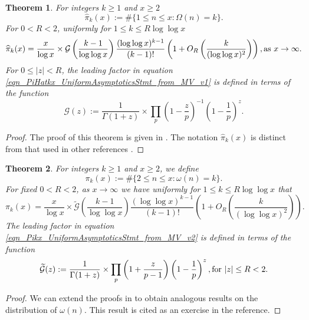 \documentclass[11pt,reqno,a4letter]{article}
\numberwithin{equation}{section}
\numberwithin{figure}{section}
\numberwithin{table}{section}
\let\citep\cite
\newcommand{\cf}{cf.~}
\theoremstyle{plain}
\newtheorem{theorem}{Theorem}
\numberwithin{theorem}{section}
\theoremstyle{definition}
\theoremstyle{remark}
\newcommand{\mathtext}[1]{\text{\rm #1}}
\begin{document}
\begin{theorem}
\label{theorem_HatPi_ExtInTermsOfGz} 
For integers $k \geq 1$ and $x \geq 2$ 
$$\widehat{\pi}_k(x) := \#\{1 \leq n \leq x: \Omega(n)=k\}.$$ 
For $0 < R < 2$, uniformly for $1 \leq k \leq R \log\log x$ 
\begin{equation}
\label{eqn_PiHatkx_UniformAsymptoticsStmt_from_MV_v1}
\widehat{\pi}_k(x) = \frac{x}{\log x} \times \mathcal{G}\left(\frac{k-1}{\log\log x}\right) 
     \frac{(\log\log x)^{k-1}}{(k-1)!} \left(1 + O_R\left(\frac{k}{(\log\log x)^2}\right)\right), 
     \mathtext{ as } x \rightarrow \infty. 
\end{equation}
For $0 \leq |z| < R$, the leading factor in 
equation \eqref{eqn_PiHatkx_UniformAsymptoticsStmt_from_MV_v1} 
is defined in terms of the function 
\[
\mathcal{G}(z) := \frac{1}{\Gamma(1+z)} \times 
	\prod_p \left(1-\frac{z}{p}\right)^{-1} \left(1-\frac{1}{p}\right)^z. 
\]
\end{theorem}
\begin{proof}
The proof of this theorem is given in \cite[Thm.~7.19; \S 7.4]{MV}. 
The notation $\widehat{\pi}_k(x)$ is distinct from that used in 
other references \citep[Eqn.~(7.61)]{MV} \citep[\cf \S II.6]{TENENBAUM-PROBNUMT-METHODS}. 
\end{proof}

\begin{theorem} 
\label{remark_MV_Pikx_FuncResultsAnnotated_v1} 
For integers $k  \geq 1$ and $x \geq 2$, we define 
\[
\pi_k(x) := \#\{2 \leq n \leq x: \omega(n)=k\}.
\]
For fixed $0 < R < 2$, as $x \rightarrow \infty$ we have 
uniformly for $1 \leq k \leq R\log\log x$ that 
\begin{equation}
\label{eqn_Pikx_UniformAsymptoticsStmt_from_MV_v2} 
\pi_k(x) = \frac{x}{\log x} \times 
     \widetilde{\mathcal{G}}\left(\frac{k-1}{\log\log x}\right) 
     \frac{(\log\log x)^{k-1}}{(k-1)!} \left( 
     1 + O_R\left(\frac{k}{(\log\log x)^2}\right) 
     \right). 
\end{equation}
The leading factor in 
equation \eqref{eqn_Pikx_UniformAsymptoticsStmt_from_MV_v2} 
is defined in terms of the function 
\[
\widetilde{\mathcal{G}}(z) := \frac{1}{\Gamma(1+z)} \times 
	\prod_p \left(1 + \frac{z}{p-1}\right) \left(1 - \frac{1}{p}\right)^{z}, 
	\mathtext{ for } |z| \leq R < 2. 
\]
\end{theorem}
\begin{proof}
We can extend the proofs in \cite[\S 7]{MV} to obtain 
analogous results on the distribution of $\omega(n)$. 
This result is cited as an exercise in the reference. 
\end{proof}
\end{document}
